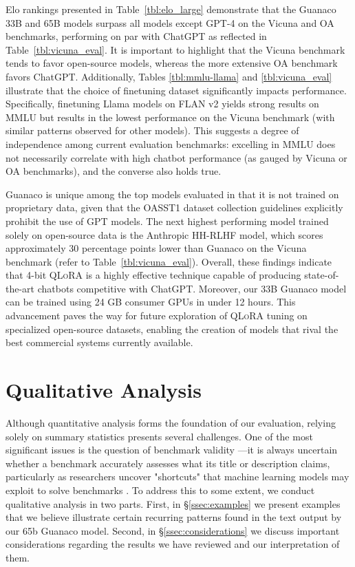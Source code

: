 Elo rankings presented in Table~\ref{tbl:elo_large} demonstrate that the {Guanaco} 33B and 65B models surpass all models except GPT-4 on the Vicuna and OA benchmarks, performing on par with ChatGPT as reflected in Table~\ref{tbl:vicuna_eval}. It is important to highlight that the Vicuna benchmark tends to favor open-source models, whereas the more extensive OA benchmark favors ChatGPT. Additionally, Tables \ref{tbl:mmlu-llama} and \ref{tbl:vicuna_eval} illustrate that the choice of finetuning dataset significantly impacts performance. Specifically, finetuning Llama models on FLAN v2 yields strong results on MMLU but results in the lowest performance on the Vicuna benchmark (with similar patterns observed for other models). This suggests a degree of independence among current evaluation benchmarks: excelling in MMLU does not necessarily correlate with high chatbot performance (as gauged by Vicuna or OA benchmarks), and the converse also holds true.

{Guanaco} is unique among the top models evaluated in that it is not trained on proprietary data, given that the OASST1 dataset collection guidelines explicitly prohibit the use of GPT models. The next highest performing model trained solely on open-source data is the Anthropic HH-RLHF model, which scores approximately 30 percentage points lower than {Guanaco} on the Vicuna benchmark (refer to Table~\ref{tbl:vicuna_eval}). Overall, these findings indicate that 4-bit \textsc{QLoRA} is a highly effective technique capable of producing state-of-the-art chatbots competitive with ChatGPT. Moreover, our 33B {Guanaco} model can be trained using 24 GB consumer GPUs in under 12 hours. This advancement paves the way for future exploration of \textsc{QLoRA} tuning on specialized open-source datasets, enabling the creation of models that rival the best commercial systems currently available.

\section{Qualitative Analysis}

Although quantitative analysis forms the foundation of our evaluation, relying solely on summary statistics presents several challenges. One of the most significant issues is the question of benchmark validity \citep{liao2021we}—it is always uncertain whether a benchmark accurately assesses what its title or description claims, particularly as researchers uncover "shortcuts" that machine learning models may exploit to solve benchmarks \citep{gururangan2018annotation, poliak2018hypothesis}. To address this to some extent, we conduct qualitative analysis in two parts. First, in \S\ref{ssec:examples} we present examples that we believe illustrate certain recurring patterns found in the text output by our 65b {Guanaco} model. Second, in \S\ref{ssec:considerations} we discuss important considerations regarding the results we have reviewed and our interpretation of them.

